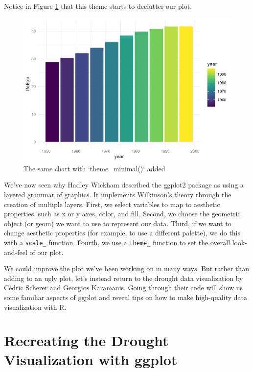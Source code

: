 \documentclass[
]{book}
\begin{document}
Notice in Figure \ref{fig:gapminder-theme-plot} that this theme starts to declutter our plot.

\begin{figure}
\includegraphics[width=1\linewidth]{data-viz_files/figure-latex/gapminder-theme-plot-1} \caption{The same chart with `theme_minimal()` added}\label{fig:gapminder-theme-plot}
\end{figure}

We've now seen why Hadley Wickham described the ggplot2 package as using a layered grammar of graphics. It implements Wilkinson's theory through the creation of multiple layers. First, we select variables to map to aesthetic properties, such as x or y axes, color, and fill. Second, we choose the geometric object (or geom) we want to use to represent our data. Third, if we want to change aesthetic properties (for example, to use a different palette), we do this with a \texttt{scale\_} function. Fourth, we use a \texttt{theme\_} function to set the overall look-and-feel of our plot.

We could improve the plot we've been working on in many ways. But rather than adding to an ugly plot, let's instead return to the drought data visualization by Cédric Scherer and Georgios Karamanis. Going through their code will show us some familiar aspects of ggplot and reveal tips on how to make high-quality data visualization with R.

\hypertarget{recreating-the-drought-visualization-with-ggplot}{%
\section*{Recreating the Drought Visualization with ggplot}\label{recreating-the-drought-visualization-with-ggplot}}
\end{document}
